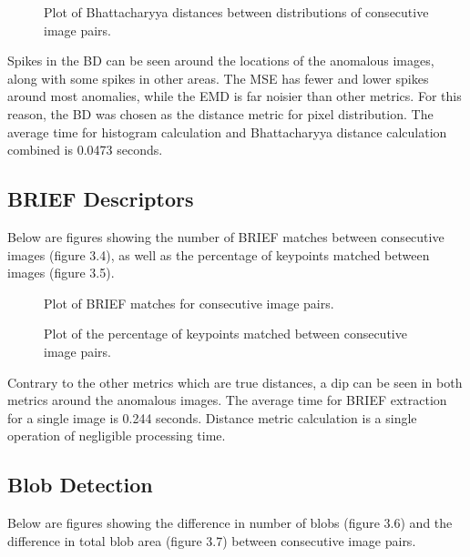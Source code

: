 \begin{figure}[htb]
\centering
\scalebox{1.0}{}
\caption{Plot of Bhattacharyya distances between distributions of consecutive image pairs.}
\label{fig:tamu-fig3}
\end{figure}


Spikes in the BD can be seen around the locations of the anomalous images, along with some spikes in other areas.
The MSE has fewer and lower spikes around most anomalies, while the EMD is far noisier than other metrics.
For this reason, the BD was chosen as the distance metric for pixel distribution.
The average time for histogram calculation and Bhattacharyya distance calculation combined is 0.0473 seconds.

\subsection{BRIEF Descriptors}

Below are figures showing the number of BRIEF matches between consecutive images (figure 3.4), as well as the percentage of keypoints matched between images (figure 3.5).


\begin{figure}[htb]
\centering
\scalebox{1.0}{}
\caption{Plot of BRIEF matches for consecutive image pairs.}
\label{fig:tamu-fig3}
\end{figure}



\begin{figure}[htb]
\centering
\scalebox{1.0}{}
\caption{Plot of the percentage of keypoints matched between consecutive image pairs.}
\label{fig:tamu-fig3}
\end{figure}

Contrary to the other metrics which are true distances, a dip can be seen in both metrics around the anomalous images.
The average time for BRIEF extraction for a single image is 0.244 seconds.
Distance metric calculation is a single operation of negligible processing time.

\subsection{Blob Detection}

Below are figures showing the difference in number of blobs (figure 3.6) and the difference in total blob area (figure 3.7) between consecutive image pairs.

